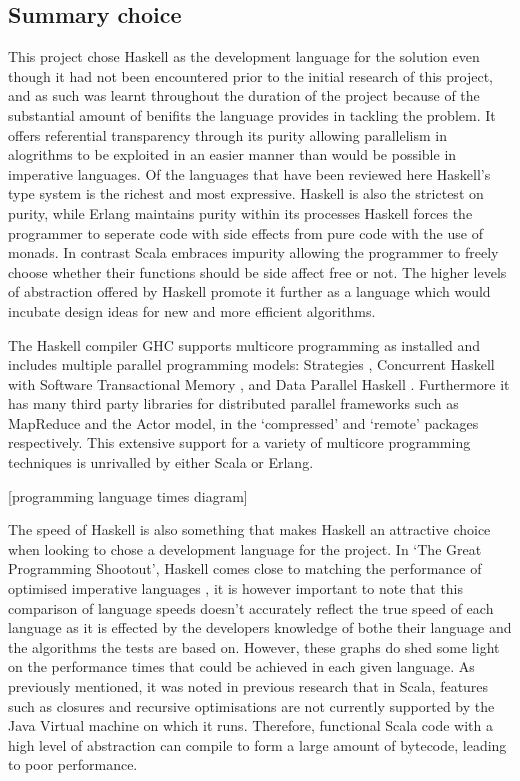 \documentclass[main.tex]{subfiles}
\begin{document}
{{\subsection{Summary choice}

This project chose Haskell as the development language for the solution even though it had not been encountered prior to the initial research of this project, and as such was learnt throughout the duration of the project because of the substantial amount of benifits the language provides in tackling the problem. It offers referential transparency through its purity allowing parallelism in alogrithms to be exploited in an easier manner than would be possible in imperative languages. Of the languages that have been reviewed here Haskell's type system is the richest and most expressive. Haskell is also the strictest on purity, while Erlang maintains purity within its processes Haskell forces the programmer to seperate code with side effects from pure code with the use of monads. In contrast Scala embraces impurity allowing the programmer to freely choose whether their functions should be side affect free or not. The higher levels of abstraction offered by Haskell promote it further as a language which would incubate design ideas for new and more efficient algorithms.

The Haskell compiler GHC supports multicore programming as installed and includes multiple parallel programming models: Strategies \cite{Trinder1998}, Concurrent Haskell \cite{Jones1996} with Software Transactional Memory \cite{Harris2005}, and Data Parallel Haskell \cite{Chakravarty2007}. Furthermore it has many third party libraries for distributed parallel frameworks such as MapReduce and the Actor model, in the `compressed' and `remote' packages respectively. This extensive support for a variety of multicore programming techniques is unrivalled by either Scala or Erlang.

[programming language times diagram]

The speed of Haskell is also something that makes Haskell an attractive choice when looking to chose a development language for the project. In `The Great Programming Shootout', Haskell comes close to matching the performance of optimised imperative languages \cite{Shootout2012}, it is however important to note that this comparison of language speeds doesn't accurately reflect the true speed of each language as it is effected by the developers knowledge of bothe their language and the algorithms the tests are based on. However, these graphs do shed some light on the performance times that could be achieved in each given language. As previously mentioned, it was noted in previous research that in Scala, features such as closures and recursive optimisations are not currently supported by the Java Virtual machine on which it runs. Therefore, functional Scala code with a high level of abstraction can compile to form a large amount of bytecode, leading to poor performance.


}}
\end{document}
